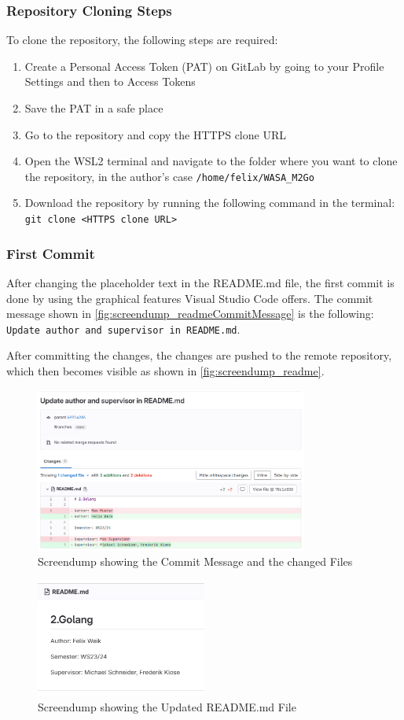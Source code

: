 \subsubsection*{Repository Cloning Steps}
To clone the repository, the following steps are required:
\begin{enumerate}
    \item Create a Personal Access Token (PAT) on GitLab by going to your Profile Settings and then to Access Tokens
    \item Save the PAT in a safe place
    \item Go to the repository and copy the HTTPS clone URL
    \item Open the WSL2 terminal and navigate to the folder where you want to clone the repository, in the author's case \texttt{/home/felix/WASA\_M2Go}
    \item Download the repository by running the following command in the terminal: \texttt{git clone <HTTPS clone URL>}
\end{enumerate}

\subsubsection*{First Commit}
After changing the placeholder text in the README.md file, the first commit is done by using the graphical features Visual Studio Code offers.
The commit message shown in \autoref{fig:screendump_readmeCommitMessage} is the following: \texttt{Update author and supervisor in README.md}.

After committing the changes, the changes are pushed to the remote repository, which then becomes visible as shown in \autoref{fig:screendump_readme}.

\begin{figure}
    \centering
    \includegraphics[width=0.8\textwidth]{figures/goLang/golang_screendumpReadmeCommit.png}
    \caption{Screendump showing the Commit Message and the changed Files}
    \label{fig:screendump_readmeCommitMessage}
\end{figure}

\begin{figure}
    \centering
    \includegraphics[width=0.5\textwidth]{figures/goLang/golang_screendumpReadme.png}
    \caption{Screendump showing the Updated README.md File}
    \label{fig:screendump_readme}
\end{figure}
